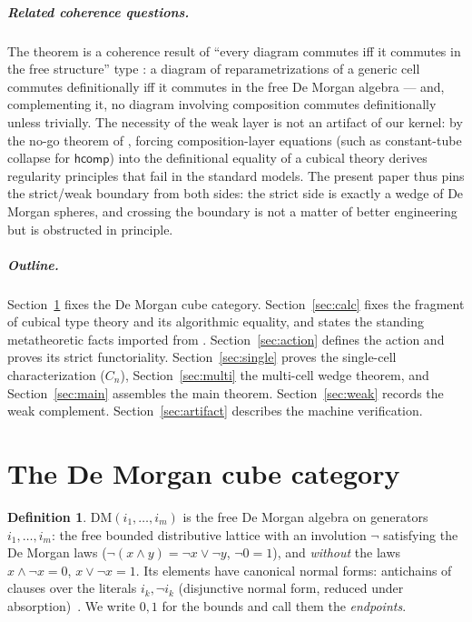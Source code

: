 \documentclass[11pt]{amsart}
\theoremstyle{definition}
\newtheorem{defi}[thm]{Definition}
\newcommand{\DM}[1]{\mathrm{DM}(#1)}
\newcommand{\hcomp}{\mathsf{hcomp}}
\begin{document}
\subparagraph*{Related coherence questions.}  The theorem is a
coherence result of ``every diagram commutes iff it commutes in the
free structure'' type \cite{MacLane}: a diagram of
reparametrizations of a generic cell commutes definitionally iff it
commutes in the free De Morgan algebra --- and, complementing it,
no diagram involving composition commutes definitionally unless
trivially.  The necessity of the weak layer is not an artifact of
our kernel: by the no-go theorem of \cite{Companion}, forcing
composition-layer equations (such as constant-tube collapse for
$\hcomp$) into the definitional equality of a cubical theory
derives regularity principles that fail in the standard models.
The present paper thus pins the strict/weak boundary from both
sides: the strict side is exactly a wedge of De Morgan spheres, and
crossing the boundary is not a matter of better engineering but is
obstructed in principle.

\subparagraph*{Outline.}  Section~\ref{sec:cube} fixes the De
Morgan cube category.  Section~\ref{sec:calc} fixes the fragment of
cubical type theory and its algorithmic equality, and states the
standing metatheoretic facts imported from \cite{Companion}.
Section~\ref{sec:action} defines the action and proves its strict
functoriality.  Section~\ref{sec:single} proves the single-cell
characterization ($C_n$), Section~\ref{sec:multi} the multi-cell
wedge theorem, and Section~\ref{sec:main} assembles the main
theorem.  Section~\ref{sec:weak} records the weak complement.
Section~\ref{sec:artifact} describes the machine verification.

\section{The De Morgan cube category}
\label{sec:cube}

\begin{defi}\label{def:dm}
  $\DM{i_1,\dots,i_m}$ is the free De Morgan algebra on generators
  $i_1,\dots,i_m$: the free bounded distributive lattice with an
  involution $\neg$ satisfying the De Morgan laws
  ($\neg(x \wedge y) = \neg x \vee \neg y$, $\neg 0 = 1$), and
  \emph{without} the laws $x \wedge \neg x = 0$,
  $x \vee \neg x = 1$.  Its elements have canonical normal forms:
  antichains of clauses over the literals
  $i_k, \neg i_k$ (disjunctive normal form, reduced under
  absorption)~\cite{CCHM}.  We write $0, 1$ for the bounds and call
  them the \emph{endpoints}.
\end{defi}
\end{document}
